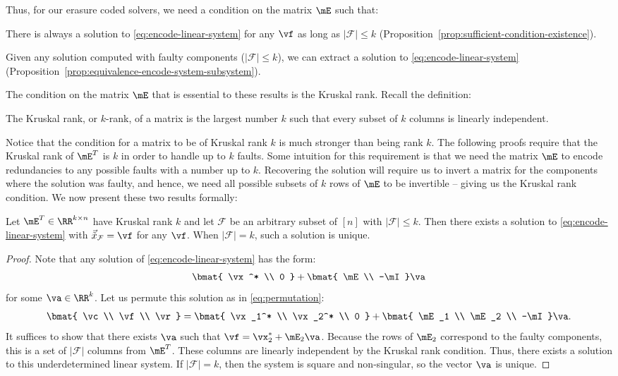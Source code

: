 \documentclass[11pt]{article}
\newcommand{\tx}{\vec{\tilde{x}}}
\newcommand{\sF}{{\mathcal{F}}}
\begin{document}
Thus, for our erasure coded solvers, we need a condition on the matrix $\mE$ such that: 
\begin{compactenum}
\item There is always a solution to \eqref{eq:encode-linear-system} for any $\vf$ as long
as $|\sF| \le k$ (Proposition~\ref{prop:sufficient-condition-existence}).
\item Given any solution computed with faulty components ($|\sF| \le k$), we can extract
a solution to \eqref{eq:encode-linear-system}
(Proposition~\ref{prop:equivalence-encode-system-subsystem}).
\end{compactenum} 
The condition on the matrix $\mE$ that is essential to these results is the Kruskal rank.
Recall the definition: 
\begin{definition}
The Kruskal rank, or $k$-rank, of a matrix is the largest number $k$ such that every
subset of $k$ columns is linearly independent.
\end{definition}
Notice that the condition for a matrix to be of Kruskal rank $k$ is much stronger than
being rank $k$. The following proofs require that the Kruskal rank of $\mE^T$ is $k$
in order to handle up to $k$ faults. Some intuition for this requirement is that
we need the matrix $\mE$ to encode redundancies to any possible faults with a number
up to $k$. Recovering the solution will require us to invert a matrix for the
components where the solution was faulty, and hence, we need all possible subsets
of $k$ rows of $\mE$ to be invertible -- giving us the Kruskal rank condition.
We now present these two results formally:

\begin{proposition} 
Let $\mE^T \in \RR^{k \times n}$ have Kruskal rank $k$ and let $\sF$ be an
arbitrary subset of $[n]$ with $|\sF| \le k$. Then there exists a solution to
\eqref{eq:encode-linear-system} with $\tx_{\sF} = \vf$ for any $\vf$.
When $|\sF|=k$, such a solution is unique.
\label{prop:sufficient-condition-existence}
\end{proposition}
\begin{proof}
Note that any solution of \eqref{eq:encode-linear-system} has the form: 
\[ \bmat{ \vx^* \\ 0 } + \bmat{ \mE \\ -\mI } \va \]
for some $\va \in \RR^{k}$. Let us permute this solution as in \eqref{eq:permutation}: 
\[ \bmat{ \vc \\ \vf \\ \vr } = \bmat{ \vx_1^* \\ \vx_2^* \\ 0 } + \bmat{ \mE_1 \\ \mE_2 \\ -\mI} \va. \]
It suffices to show that there exists $\va$ such that $\vf = \vx_2^* + \mE_2 \va$.
Because the rows of $\mE_2$ correspond to the faulty components, this is a set
of $|\sF|$ columns from $\mE^T$. These columns are linearly independent by the
Kruskal rank condition. Thus, there exists a solution to this underdetermined
linear system. If $|\sF| = k$, then the system is square and non-singular, so
the vector $\va$ is unique. 
\end{proof}
\end{document}
